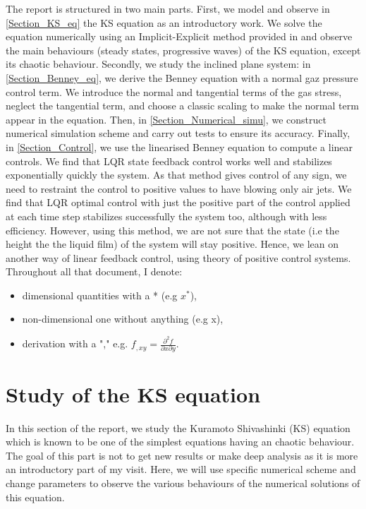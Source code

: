 \documentclass[12pt]{article}
\begin{document}
The report is structured in two main parts. First, we model and observe in \eqref{Section_KS_eq} the KS equation 
as an introductory work. We solve the equation numerically using an Implicit-Explicit method provided in 
\cite{Scheme_for_KS} and observe the main behaviours (steady states, progressive waves) of the KS equation, except its chaotic 
behaviour. Secondly, we study the inclined plane system: in \eqref{Section_Benney_eq}, we derive the Benney equation with a 
normal gaz pressure control term. We introduce the normal and tangential terms of the gas stress, neglect the tangential 
term, and choose a classic scaling to make the normal term appear in the equation.  Then, in \eqref{Section_Numerical_simu}, 
we construct numerical simulation scheme and carry out tests to ensure its accuracy. Finally, in \eqref{Section_Control}, we 
use the linearised Benney equation to compute a linear controls. We find that LQR state feedback control works well and stabilizes
 exponentially quickly the system. As that method gives control of any sign, we need to restraint the control to positive values to 
 have blowing only air jets. We find that LQR optimal control with just the positive part of the control applied at each time step stabilizes 
 successfully the system too, although with less efficiency. However, using this method, we are not sure that the state (i.e the height the the 
 liquid film) of the system will stay positive. Hence, we lean on another way of linear feedback control, using theory of positive control systems. 
\\

Throughout all that document, I denote: 
\begin{itemize}
    \item dimensional quantities with a * (e.g $x^*$), 
    \item non-dimensional one without anything (e.g x), 
    \item derivation with a "," e.g. $f_{,xy} = \frac{\partial^2 f}{\partial x\partial y}.$
\end{itemize}

\newpage
\section{Study of the KS equation}\label{Section_KS_eq}


In this section of the report, we study the Kuramoto Shivashinki (KS) equation which is known to be one of the simplest equations having an chaotic behaviour.  The goal of this part is not to get new results or make deep analysis as it is more an introductory part of my visit. Here, we will use specific numerical scheme and change parameters to observe the various behaviours of the numerical solutions of this equation. 
\end{document}
